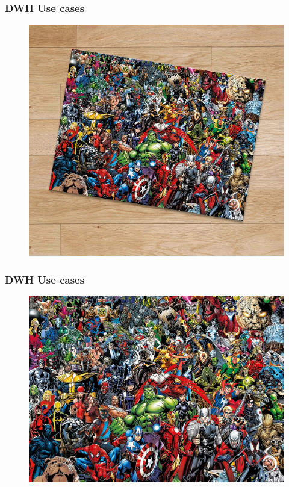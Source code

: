 \begin{frame}
\frametitle{DWH Use cases}
\begin{figure}[ht]

\centering
\includegraphics[width=\linewidth,height=.8\textheight]{./Figures/chapter-01/Marvel-02.jpg}
\end{figure}
\end{frame}

\begin{frame}
\frametitle{DWH Use cases}
\begin{figure}[ht]

\centering
\includegraphics[width=\linewidth,height=.8\textheight]{./Figures/chapter-01/Marvel-01.jpg}
\end{figure}
\end{frame}

